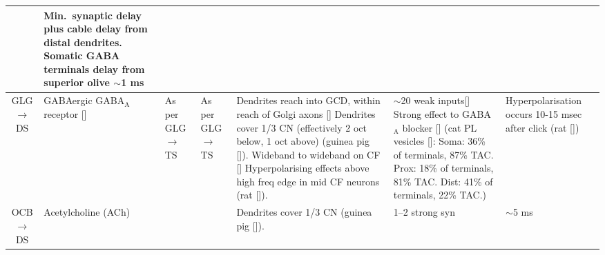 \begin{longtable}{cYYYYYY}
& %
Min.\ synaptic delay plus cable delay from distal dendrites.
Somatic GABA terminals delay from superior olive $\sim$1 ms
\\ \midrule
GLG\ensuremath{\rightarrow}DS                         
& %
{GABAergic} {GABA$_{\textrm{A}}$} receptor []
& %
As per GLG\ensuremath{\rightarrow}TS
& %
As per GLG\ensuremath{\rightarrow}TS
& %
Dendrites reach into GCD, within reach of Golgi axons []     
Dendrites cover 1/3 CN (effectively 2 oct below, 1 oct above) (guinea pig []).
Wideband to wideband on CF [] 
Hyperpolarising effects above high freq edge in mid CF neurons (rat []).                    
& %
$\sim$20 weak inputs[]
Strong effect to {GABA$_{\textrm{A}}$} blocker  []
(cat PL vesicles []:
Soma: 36\% of terminals, 87\% TAC. 
Prox: 18\% of terminals, 81\% TAC. 
Dist: 41\% of terminals, 22\% TAC.)
& %
Hyperpolarisation occurs 10-15 msec after click (rat [])
\\ \midrule

OCB$\rightarrow$DS
& Acetylcholine (ACh)
& 
&
& Dendrites cover 1/3 CN (guinea pig []).
& 1--2 strong syn \citep{MuldersPaoliniEtAl:2009,HorvathKrausEtAl:2000,MuldersPaoliniEtAl:2003}
& $\sim$5 ms \citep{MuldersPaoliniEtAl:2009}\\
\end{longtable}





